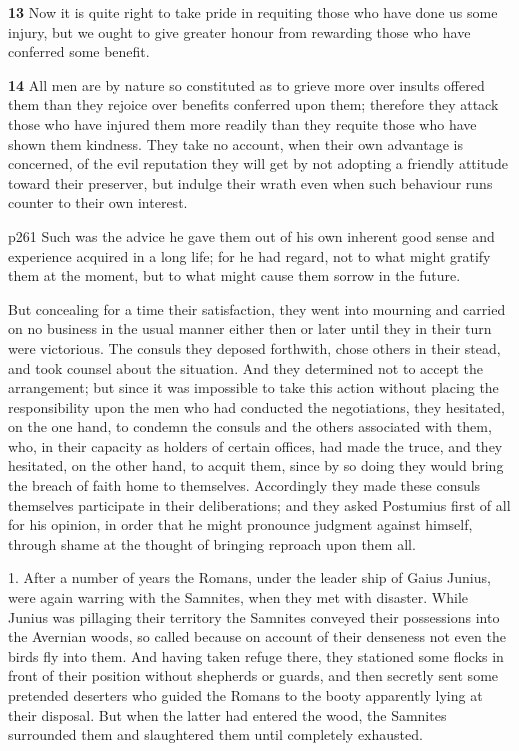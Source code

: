 \textbf{13} Now it is quite right to take pride in requiting those who have done us some injury, but we ought to give greater honour from rewarding those who have conferred some benefit.

\textbf{14} All men are by nature so constituted as to grieve more over insults offered them than they rejoice over benefits conferred upon them; therefore they attack those who have injured them more readily than they requite those who have shown them kindness. They take no account, when their own advantage is concerned, of the evil reputation they will get by not adopting a friendly attitude toward their preserver, but indulge their wrath even when such behaviour runs counter to their own interest.

p261
Such was the advice he gave them out of his own inherent good sense and experience acquired in a long life; for he had regard, not to what might gratify them at the moment, but to what might cause them sorrow in the future.

But concealing for a time their satisfaction, they went into mourning and carried on no business in the usual manner either then or later until they in their turn were victorious. The consuls they deposed forthwith, chose others in their stead, and took counsel about the situation. And they determined not to accept the arrangement; but since it was impossible to take this action without pla­cing the responsibility upon the men who had conducted the negotiations, they hesitated, on the one hand, to condemn the consuls and the others associated with them, who, in their capacity as holders of certain offices, had made the truce, and they hesitated, on the other hand, to acquit them, since by so doing they would bring the breach of faith home to themselves. Accordingly they made these consuls themselves participate in their deliberations; and they asked Postumius first of all for his opinion, in order that he might pronounce judgment against himself, through shame at the thought of bringing reproach upon them all.

1. After a number of years the Romans, under the leader ­ship of Gaius Junius, were again warring with the Samnites, when they met with disaster. While Junius was pillaging their territory the Samnites conveyed their possessions into the Avernian woods, so called because on account of their denseness not even the birds fly into them. And having taken refuge there, they stationed some flocks in front of their position without shepherds or guards, and then secretly sent some pretended deserters who guided the Romans to the booty apparently lying at their disposal. But when the latter had entered the wood, the Samnites surrounded them and slaughtered them until completely exhausted.

